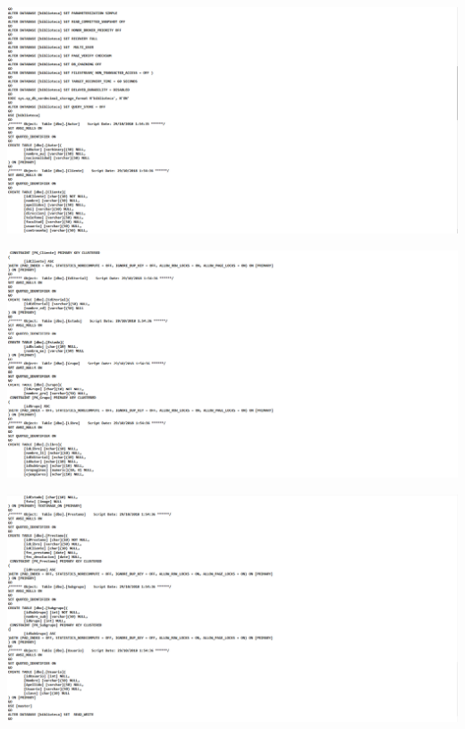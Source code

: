 \vspace{3mm} %
\begin{center}
\includegraphics[width=19cm]{./Imagenes/006}
\end{center}	
\vspace{3mm} %

\vspace{3mm} %
\begin{center}
\includegraphics[width=19cm]{./Imagenes/007}
\end{center}	
\vspace{3mm} %

\vspace{3mm} %
\begin{center}
\includegraphics[width=19cm]{./Imagenes/008}
\end{center}	
\vspace{3mm} %


